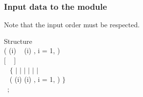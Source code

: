 \vskip 0.2cm

\subsubsection{Input data to the  module}\label{sect:cvrstr}

\noindent
Note that the input order must be respected.\\

\begin{DataStructure}{Structure }
~  \\
(  (i) ~ (i) ,  i = 1,  ) \\
$[$   ~  $]$ \\
~ $\{$  $|$  $|$  $|$
 $|$  $|$  $|$ \\
~  ( (i) (i) ,  i = 1,  ) $\}$ \\
~;
\end{DataStructure}

